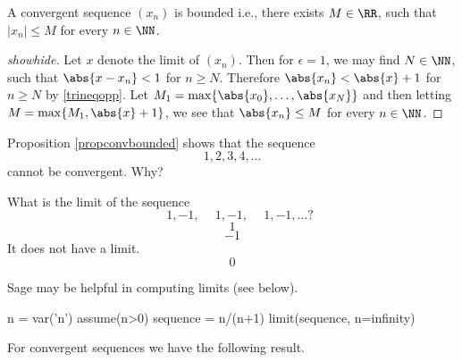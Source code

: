 \documentclass{article}
\begin{document}
\begin{proposition}\label{propconvbounded}
  A convergent sequence $(x_n)$ is bounded i.e., there exists $M\in \RR$, such that
  $|x_n| \leq M$ for every $n\in \NN$.
\end{proposition}
  \begin{proof}[showhide]
    Let $x$ denote the limit of $(x_n)$. Then for $\epsilon = 1$, we may find
    $N\in \NN$, such that $\abs{x - x_n} < 1$ for $n\geq N$. Therefore
    $\abs{x_n} < \abs{x} + 1$ for $n\geq N$ by \eqref{trineqopp}. Let
    $M_1 = \max\{\abs{x_0}, \dots, \abs{x_N}\}$ and then letting
    $M = \max\{M_1, \abs{x} + 1\}$, we see that $\abs{x_n} \leq M$
    for every $n\in \NN$.
  \end{proof}


  \begin{example}
    Proposition \ref{propconvbounded} shows that the sequence
    $$
    1, 2, 3, 4, \dots
    $$
    cannot be convergent. Why?
  \end{example}


  


\newcommand{\phmi}{\phantom{-}}
\begin{quizexercise}[showhide]
\begin{quiz}
  \question
  What is the limit of the sequence
  $$
  \phmi 1, -1, \phmi 1, -1, \phmi 1, -1, \dots ?
  $$
  $$1$$
  $$-1$$
  It does not have a limit.
  $$0$$
\end{quiz}
\end{quizexercise}

Sage may be helpful in computing limits (see below).

\begin{sage}
n = var('n')
assume(n>0)
sequence = n/(n+1)
limit(sequence, n=infinity)
\end{sage}


For convergent sequences we have the following result.
\end{document}
